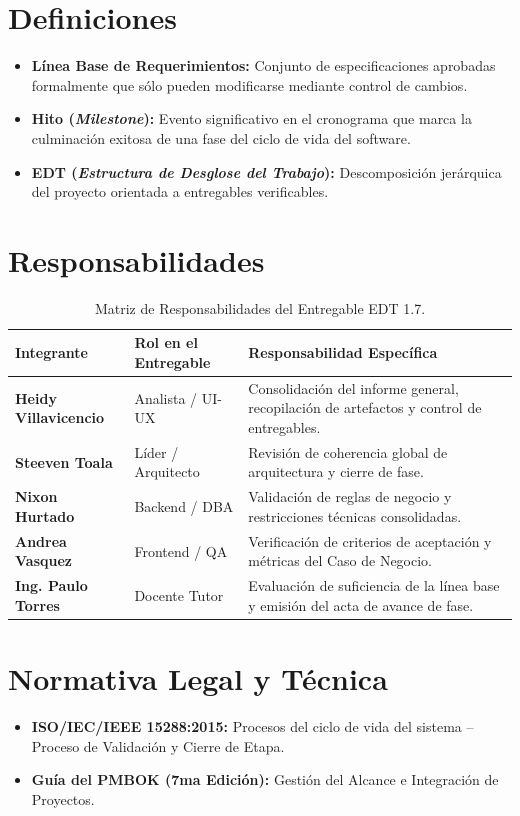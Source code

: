 \documentclass[12pt,a4paper]{article}
\begin{document}
\section{Definiciones}
\begin{itemize}[leftmargin=1.5em, itemsep=2pt]
    \item \textbf{Línea Base de Requerimientos:} Conjunto de especificaciones aprobadas formalmente que sólo pueden modificarse mediante control de cambios.
    \item \textbf{Hito (\textit{Milestone}):} Evento significativo en el cronograma que marca la culminación exitosa de una fase del ciclo de vida del software.
    \item \textbf{EDT (\textit{Estructura de Desglose del Trabajo}):} Descomposición jerárquica del proyecto orientada a entregables verificables.
\end{itemize}

\section{Responsabilidades}
\begin{table}[htbp]
\centering
\small
\begin{tabularx}{\textwidth}{|>{\hsize=0.65\hsize\bfseries}X|>{\hsize=0.85\hsize}X|>{\hsize=1.5\hsize}X|}
    \hline
    \rowcolor{tableheader}
    Integrante & Rol en el Entregable & Responsabilidad Específica \\
    \hline
    Heidy Villavicencio & Analista / UI-UX & Consolidación del informe general, recopilación de artefactos y control de entregables. \\
    \hline
    Steeven Toala & Líder / Arquitecto & Revisión de coherencia global de arquitectura y cierre de fase. \\
    \hline
    Nixon Hurtado & Backend / DBA & Validación de reglas de negocio y restricciones técnicas consolidadas. \\
    \hline
    Andrea Vasquez & Frontend / QA & Verificación de criterios de aceptación y métricas del Caso de Negocio. \\
    \hline
    Ing. Paulo Torres & Docente Tutor & Evaluación de suficiencia de la línea base y emisión del acta de avance de fase. \\
    \hline
\end{tabularx}
\caption{Matriz de Responsabilidades del Entregable EDT 1.7.}
\end{table}

\section{Normativa Legal y Técnica}
\begin{itemize}[leftmargin=1.5em, itemsep=2pt]
    \item \textbf{ISO/IEC/IEEE 15288:2015:} Procesos del ciclo de vida del sistema -- Proceso de Validación y Cierre de Etapa.
    \item \textbf{Guía del PMBOK (7ma Edición):} Gestión del Alcance e Integración de Proyectos.
\end{itemize}
\end{document}
